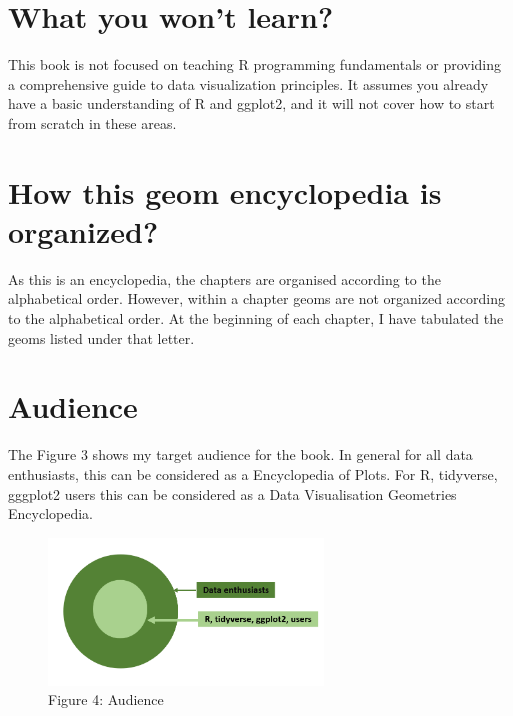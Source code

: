 \documentclass[
  letterpaper,
  DIV=11,
  numbers=noendperiod]{scrreprt}
\begin{document}
\section*{What you won't learn?}\label{what-you-wont-learn}


This book is not focused on teaching R programming fundamentals or
providing a comprehensive guide to data visualization principles. It
assumes you already have a basic understanding of R and ggplot2, and it
will not cover how to start from scratch in these areas.

\section*{\texorpdfstring{How this {geom encyclopedia} is
organized?}{How this geom encyclopedia is organized?}}\label{how-this-geom-encyclopedia-is-organized}


As this is an encyclopedia, the chapters are organised according to the
alphabetical order. However, within a chapter geoms are not organized
according to the alphabetical order. At the beginning of each chapter, I
have tabulated the geoms listed under that letter.

\section*{Audience}\label{audience}


The Figure 3 shows my target audience for the book. In general for all
data enthusiasts, this can be considered as a {Encyclopedia of Plots}.
For R, tidyverse, gggplot2 users this can be considered as a {Data
Visualisation Geometries Encyclopedia}.

\begin{figure}[H]

{\centering \includegraphics[width=2.87in,height=\textheight]{audience.png}

}

\caption{Figure 4: Audience}

\end{figure}%
\end{document}
